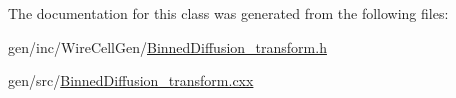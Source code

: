 The documentation for this class was generated from the following files\+:\begin{DoxyCompactItemize}
\item 
gen/inc/\+Wire\+Cell\+Gen/\hyperlink{_binned_diffusion__transform_8h}{Binned\+Diffusion\+\_\+transform.\+h}\item 
gen/src/\hyperlink{_binned_diffusion__transform_8cxx}{Binned\+Diffusion\+\_\+transform.\+cxx}\end{DoxyCompactItemize}
